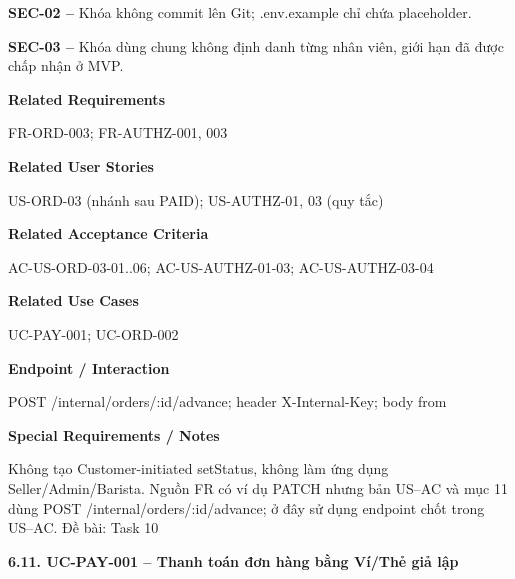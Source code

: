 \documentclass[11pt,a4paper,oneside]{report}
\begin{document}
\textbf{SEC-02 --} Khóa không commit lên Git; .env.example chỉ chứa placeholder.

\textbf{SEC-03 --} Khóa dùng chung không định danh từng nhân viên, giới hạn đã được chấp nhận ở MVP.
\par

\par\smallskip\noindent\textcolor{sgublue}{\textbf{Related Requirements}}\par\nobreak
FR-ORD-003; FR-AUTHZ-001, 003
\par

\par\smallskip\noindent\textcolor{sgublue}{\textbf{Related User Stories}}\par\nobreak
US-ORD-03 (nhánh sau PAID); US-AUTHZ-01, 03 (quy tắc)
\par

\par\smallskip\noindent\textcolor{sgublue}{\textbf{Related Acceptance Criteria}}\par\nobreak
AC-US-ORD-03-01..06; AC-US-AUTHZ-01-03; AC-US-AUTHZ-03-04
\par

\par\smallskip\noindent\textcolor{sgublue}{\textbf{Related Use Cases}}\par\nobreak
UC-PAY-001; UC-ORD-002
\par

\par\smallskip\noindent\textcolor{sgublue}{\textbf{Endpoint / Interaction}}\par\nobreak
POST /internal/orders/:id/advance; header X-Internal-Key; body from
\par

\par\smallskip\noindent\textcolor{sgublue}{\textbf{Special Requirements / Notes}}\par\nobreak
Không tạo Customer-initiated setStatus, không làm ứng dụng Seller/Admin/Barista. Nguồn FR có ví dụ PATCH nhưng bản US--AC và mục 11 dùng POST /internal/orders/:id/advance; ở đây sử dụng endpoint chốt trong US--AC. \textbar{} Đề bài: Task 10
\par



\textbf{6.11. UC-PAY-001 -- Thanh toán đơn hàng bằng Ví/Thẻ giả lập}


\end{document}

